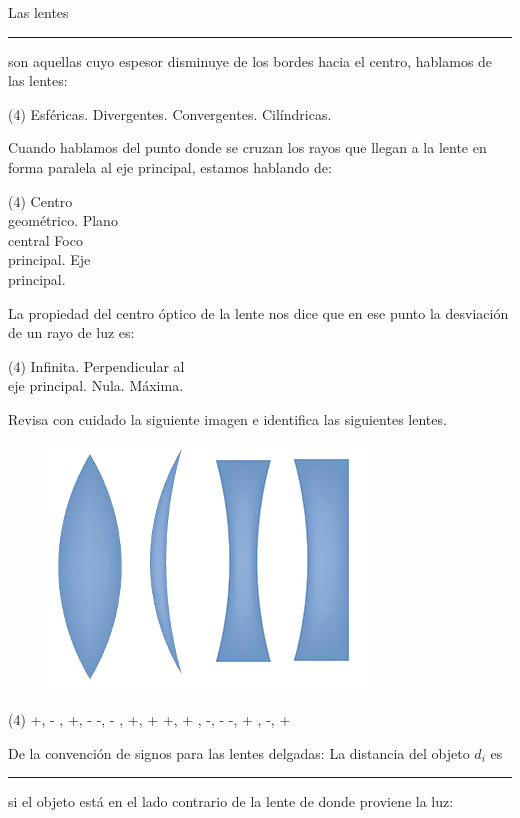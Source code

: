 \documentclass[12pt, letter]{exam}
\begin{document}
\begin{questions}
    \question Las lentes \rule{2.5cm}{0.1mm} son aquellas cuyo espesor disminuye de los bordes hacia el centro, hablamos de las lentes:
    \begin{tasks}(4)
        \task Esféricas.
        \task Divergentes.
        \task Convergentes.
        \task Cilíndricas.
    \end{tasks}
    \question Cuando hablamos del punto donde se cruzan los rayos que llegan a la lente en forma paralela al eje principal, estamos hablando de:
    \begin{tasks}(4)
        \task Centro \\ geométrico.
        \task Plano \\ central
        \task Foco \\ principal.
        \task Eje \\ principal.
    \end{tasks}
    \question La propiedad del centro óptico de la lente nos dice que en ese punto la desviación de un rayo de luz es:
    \begin{tasks}(4)
        \task Infinita.
        \task Perpendicular al \\ eje principal.
        \task Nula.
        \task Máxima.
    \end{tasks}
    \question Revisa con cuidado la siguiente imagen e identifica las siguientes lentes.
    \begin{figure}[H]
        \centering
        \includegraphics[scale=2]{Imagenes/Arreglo_Lentes_02.png}
    \end{figure}
    \begin{tasks}(4)
        \task +, - , +, - 
        \task -, - , +, + 
        \task +, + , -, - 
        \task -, + , -, + 
    \end{tasks}
    \question De la convención de signos para las lentes delgadas:  La distancia del objeto $d_{i}$ es \rule{2cm}{0.1mm} si el objeto está en el lado contrario de la lente de donde proviene la luz:

\end{questions}
\end{document}
